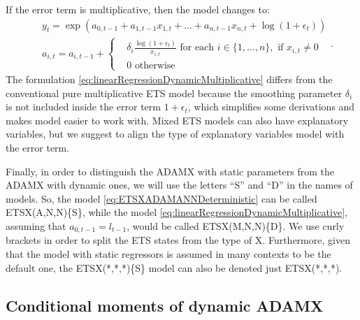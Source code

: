 \documentclass[
]{book}
\theoremstyle{definition}
\theoremstyle{definition}
\theoremstyle{definition}
\theoremstyle{definition}
\theoremstyle{remark}
\begin{document}
If the error term is multiplicative, then the model changes to:
\begin{equation}
  \begin{aligned}
    & y_{t} = \exp \left(a_{0,t-1} + a_{1,t-1} x_{1,t} + \dots + a_{n,t-1} x_{n,t} + \log(1+ \epsilon_t) \right) \\
    & a_{i,t} = a_{i,t-1} + \left \lbrace \begin{aligned}
                  &\delta_i \frac{\log(1+\epsilon_t)}{x_{i,t}} \text{ for each } i \in \{1, \dots, n\}, \text{ if } x_{i,t}\neq 0 \\
                  &0 \text{ otherwise }
            \end{aligned} \right.
  \end{aligned} .
  \label{eq:linearRegressionDynamicMultiplicative}
\end{equation}
The formulation \eqref{eq:linearRegressionDynamicMultiplicative} differs from the conventional pure multiplicative ETS model because the smoothing parameter \(\delta_i\) is not included inside the error term \(1+\epsilon_t\), which simplifies some derivations and makes model easier to work with. Mixed ETS models can also have explanatory variables, but we suggest to align the type of explanatory variables model with the error term.

Finally, in order to distinguish the ADAMX with static parameters from the ADAMX with dynamic ones, we will use the letters ``S'' and ``D'' in the names of models. So, the model \eqref{eq:ETSXADAMANNDeterministic} can be called ETSX(A,N,N)\{S\}, while the model \eqref{eq:linearRegressionDynamicMultiplicative}, assuming that \(a_{0,t-1}=l_{t-1}\), would be called ETSX(M,N,N)\{D\}. We use curly brackets in order to split the ETS states from the type of X. Furthermore, given that the model with static regressors is assumed in many contexts to be the default one, the ETSX(*,*,*)\{S\} model can also be denoted just ETSX(*,*,*).

\hypertarget{ADAMXDynamicMoments}{%
\subsection{Conditional moments of dynamic ADAMX}\label{ADAMXDynamicMoments}}
\end{document}
